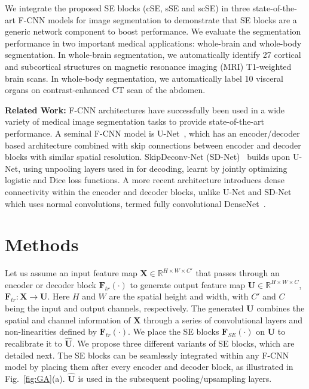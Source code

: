 \documentclass{llncs}
\begin{document}
We integrate the proposed SE blocks (cSE, sSE and scSE) in three state-of-the-art F-CNN models for image segmentation to demonstrate that SE blocks are a generic network component to boost performance. We evaluate the segmentation performance in two important medical applications: whole-brain and whole-body segmentation. In whole-brain segmentation,  we automatically identify 27 cortical and subcortical structures on magnetic resonance imaging (MRI) T1-weighted brain scans. In whole-body segmentation, we automatically label 10 visceral organs on contrast-enhanced CT scan of the abdomen.

\noindent
\textbf{Related Work: }
F-CNN architectures have successfully been used in a wide variety of medical image segmentation tasks to provide state-of-the-art performance. A seminal F-CNN model is U-Net~\cite{Unet}, which has an encoder/decoder based architecture combined with skip connections between encoder and decoder blocks with similar spatial resolution. SkipDeconv-Net (SD-Net)~\cite{ecb2017} builds upon U-Net, using unpooling layers used in \cite{deconvnet2015} for decoding, learnt by jointly optimizing logistic and Dice loss functions. A more recent architecture introduces dense connectivity within the encoder and decoder blocks, unlike U-Net and SD-Net which uses normal convolutions, termed fully convolutional DenseNet~\cite{densenet}.

\section{Methods}
Let us assume an input feature map $\mathbf{X} \in \mathbb{R}^{H \times W \times C'}$ that passes through an encoder or decoder block $\mathbf{F}_{tr}(\cdot)$ to generate output feature map $\mathbf{U} \in \mathbb{R}^{H \times W \times C}$,  $\mathbf{F}_{tr}:\mathbf{X}\rightarrow\mathbf{U}$.  Here $H$ and $W$ are the spatial height and width, with $C'$ and $C$ being the input and output channels, respectively. The generated $\mathbf{U}$  combines the spatial and channel information of $\mathbf{X}$ through a series of convolutional layers and non-linearities defined by $\mathbf{F}_{tr}(\cdot)$. We place the SE blocks $\mathbf{F}_{SE}(\cdot)$ on $\mathbf{U}$ to recalibrate it to $\hat{\mathbf{U}}$. We propose three different variants of SE blocks, which are detailed next. The SE blocks can be seamlessly integrated within any F-CNN model by placing them after every encoder and decoder block, as illustrated in Fig.~\ref{fig:GA}(a). $\hat{\mathbf{U}}$ is used in the subsequent pooling/upsampling layers.
\end{document}
